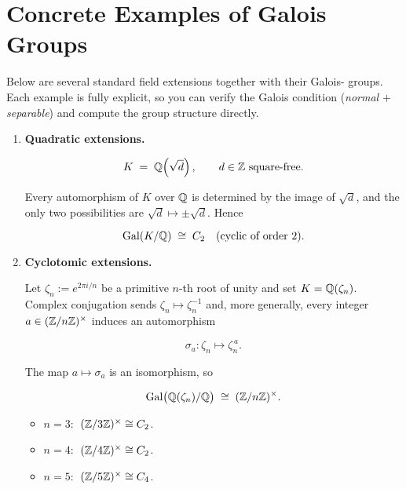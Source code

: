 \documentclass[12pt]{article}
\theoremstyle{definition} %
\theoremstyle{plain} %
\begin{document}
\section*{Concrete Examples of Galois Groups}

Below are several standard field extensions together with their Galois-
groups.  Each example is fully explicit, so you can verify the Galois
condition (\emph{normal} $+$ \emph{separable}) and compute the group
structure directly.

\bigskip
\begin{enumerate}
\item \textbf{Quadratic extensions.}

      \[
         K \;=\; \Bbb Q\!\left(\sqrt d\right), 
         \qquad d\in\Bbb Z \text{ square-free}.
      \]

      Every automorphism of $K$ over $\Bbb Q$ is determined by the image
      of $\sqrt d$, and the only two possibilities are
      $\sqrt d \mapsto \pm\sqrt d$.  Hence 

      \[
         \operatorname{Gal}(K/\Bbb Q)
           \;\cong\; C_2
           \quad\text{(cyclic of order $2$)}.
      \]

\item \textbf{Cyclotomic extensions.}

      Let $\zeta_n := e^{2\pi i/n}$ be a primitive $n$-th root of unity
      and set $K=\Bbb Q(\zeta_n)$.  Complex conjugation sends 
      $\zeta_n\mapsto\zeta_n^{-1}$ and, more generally, every integer
      $a\in(\Bbb Z/n\Bbb Z)^{\times}$ induces an automorphism

      \[
         \sigma_a : \zeta_n \longmapsto \zeta_n^{\,a}.
      \]

      The map $a\mapsto\sigma_a$ is an isomorphism, so

      \[
         \operatorname{Gal}\bigl(\Bbb Q(\zeta_n)/\Bbb Q\bigr)
            \;\cong\; (\Bbb Z/n\Bbb Z)^{\times}.
      \]

      \begin{itemize}
         \item $n=3$: $\;(\Bbb Z/3\Bbb Z)^{\times}\cong C_2$.
         \item $n=4$: $\;(\Bbb Z/4\Bbb Z)^{\times}\cong C_2$.
         \item $n=5$: $\;(\Bbb Z/5\Bbb Z)^{\times}\cong C_4$.
      \end{itemize}


\end{enumerate}
\end{document}
